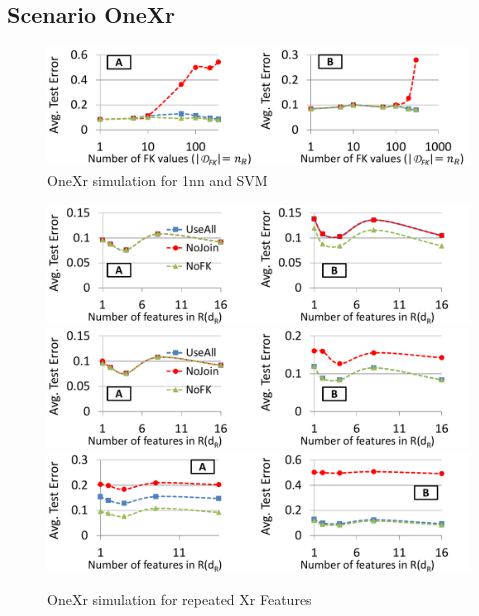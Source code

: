 \documentclass[sigconf]{acmart}
\begin{document}
\subsection{Scenario OneXr}

\begin{figure}
\centering
\includegraphics[width=\columnwidth,height=\textheight,keepaspectratio]{onexr_svm_1nn.pdf}
\caption{OneXr simulation for 1nn and SVM}
\label{Figure:OneXr1nnSVMSimulation}
\end{figure}

\begin{figure}
\centering
\includegraphics[width=\columnwidth,height=\textheight,keepaspectratio]{onexr_jerrydt.pdf}
\includegraphics[width=\columnwidth,height=\textheight,keepaspectratio]{onexr_jerrysvm.pdf}
\includegraphics[width=\columnwidth,height=\textheight,keepaspectratio]{onexr_jerry1nn.pdf}
\caption{OneXr simulation for repeated Xr Features}
\label{Figure:OneXrjerry}
\end{figure}
\end{document}
